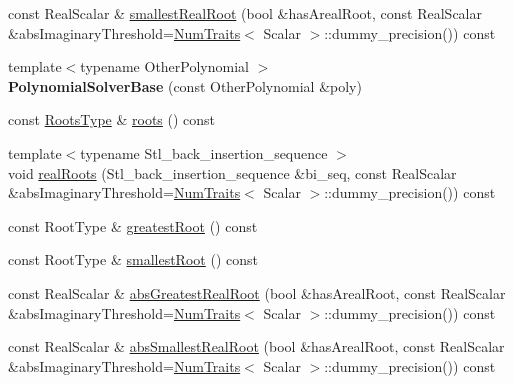\begin{DoxyCompactItemize}
\item 
const Real\+Scalar \& \hyperlink{class_eigen_1_1_polynomial_solver_base_a24b054cdf82a8e9409bea47c3c05c756}{smallest\+Real\+Root} (bool \&has\+Areal\+Root, const Real\+Scalar \&abs\+Imaginary\+Threshold=\hyperlink{group___core___module_struct_eigen_1_1_num_traits}{Num\+Traits}$<$ Scalar $>$\+::dummy\+\_\+precision()) const
\item 
\mbox{\label{class_eigen_1_1_polynomial_solver_base_a117e0c16d65aa7e670b793e271d13cc4}} 
{\footnotesize template$<$typename Other\+Polynomial $>$ }\\{\bfseries Polynomial\+Solver\+Base} (const Other\+Polynomial \&poly)
\item 
const \hyperlink{group___core___module}{Roots\+Type} \& \hyperlink{class_eigen_1_1_polynomial_solver_base_a07bcd5339be5eacdf7e566d07d81bedb}{roots} () const
\item 
{\footnotesize template$<$typename Stl\+\_\+back\+\_\+insertion\+\_\+sequence $>$ }\\void \hyperlink{class_eigen_1_1_polynomial_solver_base_a4ea3b29499623832a0ad7b2b3ab05597}{real\+Roots} (Stl\+\_\+back\+\_\+insertion\+\_\+sequence \&bi\+\_\+seq, const Real\+Scalar \&abs\+Imaginary\+Threshold=\hyperlink{group___core___module_struct_eigen_1_1_num_traits}{Num\+Traits}$<$ Scalar $>$\+::dummy\+\_\+precision()) const
\item 
const Root\+Type \& \hyperlink{class_eigen_1_1_polynomial_solver_base_a0327769cc88877a79c7c838f03d78384}{greatest\+Root} () const
\item 
const Root\+Type \& \hyperlink{class_eigen_1_1_polynomial_solver_base_a64389d0acf586c772fb3d1db47a3f7ef}{smallest\+Root} () const
\item 
const Real\+Scalar \& \hyperlink{class_eigen_1_1_polynomial_solver_base_aa2f003d9662af8c776f1a1c12a9d4210}{abs\+Greatest\+Real\+Root} (bool \&has\+Areal\+Root, const Real\+Scalar \&abs\+Imaginary\+Threshold=\hyperlink{group___core___module_struct_eigen_1_1_num_traits}{Num\+Traits}$<$ Scalar $>$\+::dummy\+\_\+precision()) const
\item 
const Real\+Scalar \& \hyperlink{class_eigen_1_1_polynomial_solver_base_a9316eeb24076bcd4f60ea4d7f3e549eb}{abs\+Smallest\+Real\+Root} (bool \&has\+Areal\+Root, const Real\+Scalar \&abs\+Imaginary\+Threshold=\hyperlink{group___core___module_struct_eigen_1_1_num_traits}{Num\+Traits}$<$ Scalar $>$\+::dummy\+\_\+precision()) const
\item 

\end{DoxyCompactItemize}
